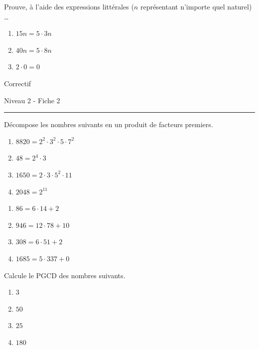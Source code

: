 \documentclass[12pt,parskip=half-, twoside=semi]{scrartcl}
\begin{document}
      \begin{exercise}
          Prouve, à l'aide des expressions littérales (\(n\) représentant n'importe quel naturel) \dots 
          \begin{enumerate}
            \item \(15n = 5 \cdot 3n\)
            \item \(40n = 5 \cdot 8n\)
            \item \(2 \cdot 0 = 0\) 
          \end{enumerate}
        \end{exercise}


\newpage
  \begin{center}
  \bfseries
  \begin{Huge}
  Correctif
  \end{Huge}
  \smallbreak
  \begin{large}
  Niveau 2  - Fiche 2
  \end{large}
  \smallbreak
  \rule[10pt]{.5\linewidth}{1 pt}
  \end{center}

\setcounter{exercise}{0}
  
  \begin{exercise}
    Décompose les nombres suivants en un produit de facteurs premiers.
      \begin{enumerate}[cols=2]
        \item $8820 = 2^2 \cdot 3^2 \cdot 5 \cdot 7^2$
        \item $48 = 2^4 \cdot 3$
        \item $1650 = 2 \cdot 3 \cdot 5^2 \cdot 11$
        \item $2048 = 2^{11}$
      \end{enumerate}
  \end{exercise}
  
  \begin{exercise}
      \begin{enumerate}[cols=2]
        \item $86=6\cdot14+2$
        \item $946=12\cdot78+10$
        \item $308=6\cdot51+2$
        \item $1685=5\cdot337+0$
      \end{enumerate}
  \end{exercise}
  
  \begin{exercise}
    Calcule le PGCD des nombres suivants. 
      \begin{enumerate}[cols=2]
        \item $3$
        \item $50$
        \item $25$
        \item $180$
      \end{enumerate}
  \end{exercise}
  
\end{document}
